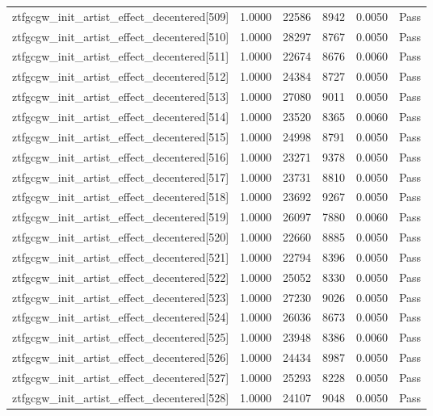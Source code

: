 \begin{table}[htbp]
\begin{tabular}{llrrll}
ztfgcgw\_init\_artist\_effect\_decentered[509] & 1.0000 & 22586 & 8942 & 0.0050 & Pass \\
ztfgcgw\_init\_artist\_effect\_decentered[510] & 1.0000 & 28297 & 8767 & 0.0050 & Pass \\
ztfgcgw\_init\_artist\_effect\_decentered[511] & 1.0000 & 22674 & 8676 & 0.0060 & Pass \\
ztfgcgw\_init\_artist\_effect\_decentered[512] & 1.0000 & 24384 & 8727 & 0.0050 & Pass \\
ztfgcgw\_init\_artist\_effect\_decentered[513] & 1.0000 & 27080 & 9011 & 0.0050 & Pass \\
ztfgcgw\_init\_artist\_effect\_decentered[514] & 1.0000 & 23520 & 8365 & 0.0060 & Pass \\
ztfgcgw\_init\_artist\_effect\_decentered[515] & 1.0000 & 24998 & 8791 & 0.0050 & Pass \\
ztfgcgw\_init\_artist\_effect\_decentered[516] & 1.0000 & 23271 & 9378 & 0.0050 & Pass \\
ztfgcgw\_init\_artist\_effect\_decentered[517] & 1.0000 & 23731 & 8810 & 0.0050 & Pass \\
ztfgcgw\_init\_artist\_effect\_decentered[518] & 1.0000 & 23692 & 9267 & 0.0050 & Pass \\
ztfgcgw\_init\_artist\_effect\_decentered[519] & 1.0000 & 26097 & 7880 & 0.0060 & Pass \\
ztfgcgw\_init\_artist\_effect\_decentered[520] & 1.0000 & 22660 & 8885 & 0.0050 & Pass \\
ztfgcgw\_init\_artist\_effect\_decentered[521] & 1.0000 & 22794 & 8396 & 0.0050 & Pass \\
ztfgcgw\_init\_artist\_effect\_decentered[522] & 1.0000 & 25052 & 8330 & 0.0050 & Pass \\
ztfgcgw\_init\_artist\_effect\_decentered[523] & 1.0000 & 27230 & 9026 & 0.0050 & Pass \\
ztfgcgw\_init\_artist\_effect\_decentered[524] & 1.0000 & 26036 & 8673 & 0.0050 & Pass \\
ztfgcgw\_init\_artist\_effect\_decentered[525] & 1.0000 & 23948 & 8386 & 0.0060 & Pass \\
ztfgcgw\_init\_artist\_effect\_decentered[526] & 1.0000 & 24434 & 8987 & 0.0050 & Pass \\
ztfgcgw\_init\_artist\_effect\_decentered[527] & 1.0000 & 25293 & 8228 & 0.0050 & Pass \\
ztfgcgw\_init\_artist\_effect\_decentered[528] & 1.0000 & 24107 & 9048 & 0.0050 & Pass \\

\end{tabular}
\end{table}
